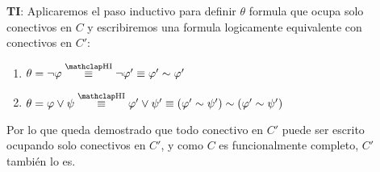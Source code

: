 \begin{enumerate}[a)]
    \textbf{TI}: Aplicaremos el paso inductivo para definir $\theta$ formula que ocupa solo conectivos en $C$ y escribiremos una formula logicamente equivalente con conectivos en $C'$:
    
    \begin{enumerate}[label=\roman*.]
        \item $\theta = \neg \varphi \myeq \neg \varphi' \equiv \varphi' \sim \varphi'$
        \item $\theta = \varphi \vee \psi \myeq \varphi' \vee \psi' \equiv (\varphi' \sim \psi') \sim (\varphi' \sim \psi')$
    \end{enumerate}
    
    Por lo que queda demostrado que todo conectivo en $C'$ puede ser escrito ocupando solo conectivos en $C'$, y como $C$ es funcionalmente completo, $C'$ también lo es.
\end{enumerate}
